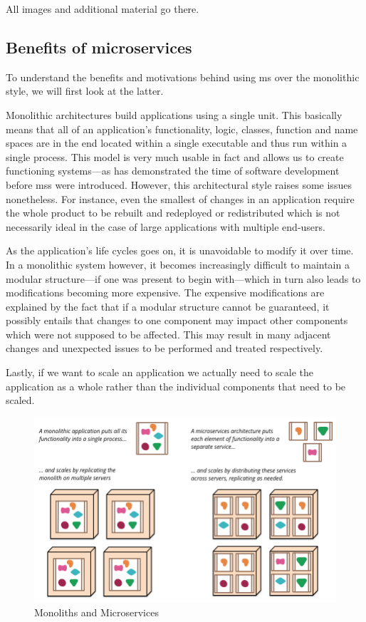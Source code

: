 {\color{gray}
All images and additional material go there.
}

\subsection{Benefits of microservices}
\label{app:ms-benefit}

To understand the benefits and motivations behind using \gls{ms} over
the monolithic style, we will first look at the latter.
\cite{ms-definition}

Monolithic architectures build applications using a single unit. This
basically means that all of an application's functionality, logic,
classes, function and name spaces are in the end located within a
single executable and thus run within a single process.
\cite{ms-definition} This model is very much usable in fact and allows
us to create functioning systems---as has demonstrated the time of
software development before \glspl{ms} were introduced. However, this
architectural style raises some issues nonetheless. For instance, even
the smallest of changes in an application require the whole product to
be rebuilt and redeployed or redistributed which is not necessarily
ideal in the case of large applications with multiple end-users.

As the application's life cycles goes on, it is unavoidable to modify
it over time. In a monolithic system however, it becomes increasingly
difficult to maintain a modular structure---if one was present to
begin with---which in turn also leads to modifications becoming more
expensive. \cite{ms-definition} The expensive modifications are
explained by the fact that if a modular structure cannot be
guaranteed, it possibly entails that changes to one component may
impact other components which were not supposed to be affected.
\cite{ms-definition} This may result in many adjacent changes and
unexpected issues to be performed and treated respectively.

Lastly, if we want to scale an application we actually need to scale
the application as a whole rather than the individual components that
need to be scaled.

\begin{figure}
	\centering
	\includegraphics[width=0.75\linewidth]{images/sketch.png}
	\caption{Monoliths and Microservices \cite{ms-definition}}
	\label{fig:monoliths-ms}
\end{figure}

